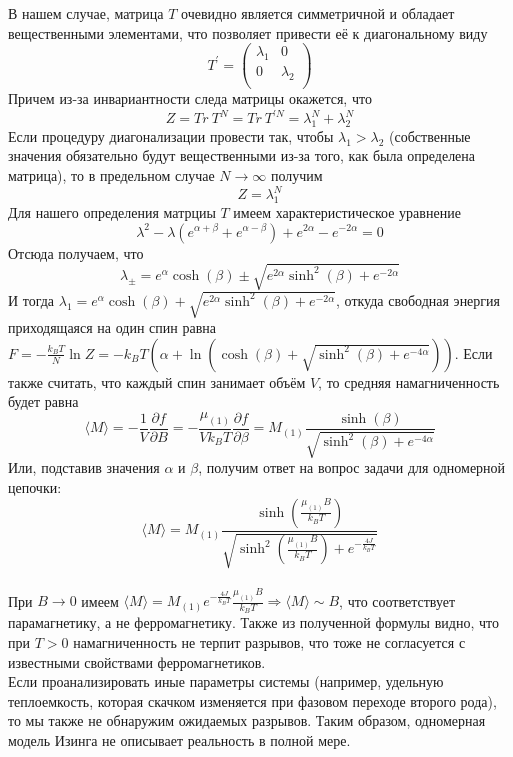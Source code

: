 \documentclass[oneside,final,14pt]{extarticle}
\begin{document}
	В нашем случае, матрица $T$ очевидно является симметричной и обладает вещественными элементами, что позволяет привести её к диагональному виду 
	$$
	T^\prime=
	\begin{pmatrix}
		\lambda_{1} & 0 \\
		0 & \lambda_{2} \\
	\end{pmatrix}
	$$
	Причем из-за инвариантности следа матрицы окажется, что 
	$$Z=Tr \ T^{N}=Tr \ T^{\prime N}=\lambda_{1}^N+\lambda_{2}^{N}$$
	Если процедуру диагонализации провести так, чтобы $\lambda_{1} > \lambda_{2}$ (собственные значения обязательно будут вещественными из-за того, как была определена матрица), то в предельном случае $N\rightarrow \infty$ получим 
	$$Z=\lambda_1^{N}$$
	Для нашего определения матрциы $T$ имеем характеристическое уравнение 
	$$\lambda^2-\lambda(e^{\alpha+\beta}+e^{\alpha-\beta})+e^{2\alpha}-e^{-2\alpha}=0$$
	Отсюда получаем, что 
	$$\lambda_{\pm}=e^{\alpha}\cosh(\beta)\pm\sqrt{e^{2\alpha}\sinh^{2}(\beta)+e^{-2\alpha}}$$
	И тогда $\lambda_{1}=e^{\alpha}\cosh(\beta)+\sqrt{e^{2\alpha}\sinh^{2}(\beta)+e^{-2\alpha}}$, откуда свободная энергия приходящаяся на один спин равна $F=-\frac{k_{B}T}{N}\ln Z=-k_{B}T\left(\alpha+\ln\left(\cosh(\beta)+\sqrt{\sinh^{2}(\beta)+e^{-4\alpha}}\right)\right)$. Если также считать, что каждый спин занимает объём $V$, то средняя намагниченность будет равна 
	$$\langle M \rangle=-\frac{1}{V}\frac{\partial f}{\partial B}=-\frac{\mu_{(1)}}{Vk_{B}T}\frac{\partial f}{\partial \beta}=M_{(1)}\frac{\sinh(\beta)}{\sqrt{\sinh^2(\beta)+e^{-4\alpha}}}$$
	Или, подставив значения $\alpha$ и $\beta$, получим ответ на вопрос задачи для одномерной цепочки:
	$$\boxed{\langle M \rangle = M_{(1)}\frac{\sinh\left(\frac{\mu_{(1)}B}{k_{B}T}\right)}{\sqrt{\sinh^2\left(\frac{\mu_{(1)}B}{k_{B}T}\right)+e^{-\frac{4J}{k_{B}T}}}}}$$ \\
	
	\noindent При $B\rightarrow 0$ имеем $\langle M \rangle=M_{(1)}e^{-\frac{4J}{k_{B}T}}\frac{\mu_{(1)}B}{k_{B}T} \Rightarrow \langle M \rangle \sim B$, что соответствует парамагнетику, а не ферромагнетику. Также из полученной формулы видно, что при $T>0$ намагниченность не терпит разрывов, что тоже не согласуется с известными свойствами ферромагнетиков. \\ 
	
	\noindent Если проанализировать иные параметры системы (например, удельную теплоемкость, которая скачком изменяется при фазовом переходе второго рода), то мы также не обнаружим ожидаемых разрывов. Таким образом, одномерная модель Изинга не описывает реальность в полной мере.
	
\end{document}
